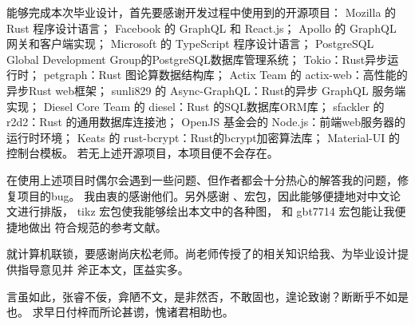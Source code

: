 \begin{arigatou}
    能够完成本次毕业设计，首先要感谢开发过程中使用到的开源项目：
    Mozilla 的 Rust 程序设计语言；
    Facebook 的 GraphQL 和 React.js；
    Apollo 的 GraphQL 网关和客户端实现；
    Microsoft 的 TypeScript 程序设计语言；
    PostgreSQL Global Development Group的PostgreSQL数据库管理系统；
    Tokio：Rust异步运行时；
    petgraph：Rust 图论算数据结构库；
    Actix Team 的 actix-web：高性能的异步Rust web框架；
    sunli829 的 Async-GraphQL：Rust的异步 GraphQL 服务端实现；
    Diesel Core Team 的 diesel：Rust 的SQL数据库ORM库；
    sfackler 的 r2d2：Rust 的通用数据库连接池；
    OpenJS 基金会的 Node.js：前端web服务器的运行时环境；
    Keats 的 rust-bcrypt：Rust的bcrypt加密算法库；
    Material-UI 的控制台模板。
    若无上述开源项目，本项目便不会存在。

    在使用上述项目时偶尔会遇到一些问题、但作者都会十分热心的解答我的问题，修复项目的bug。
    我由衷的感谢他们。另外感谢 、\CTeX 宏包，因此能够便捷地对中文论文进行排版，
    tikz 宏包使我能够绘出本文中的各种图， 和 gbt7714 宏包能让我便捷地做出
    符合规范的参考文献。

    就计算机联锁，要感谢尚庆松老师。尚老师传授了的相关知识给我、为毕业设计提供指导意见并
    斧正本文，匡益实多。

    言虽如此，张睿不佞，弇陋不文，是非然否，不敢固也，遑论致谢？断断乎不如是也。
    求早日付梓而所论甚谫，愧诸君相助也。
\end{arigatou}